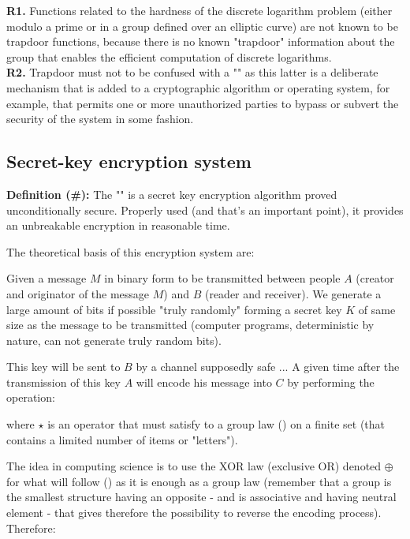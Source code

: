 	\begin{tcolorbox}[title=Remarks,colframe=black,arc=10pt]
	\textbf{R1.} Functions related to the hardness of the discrete logarithm problem (either modulo a prime or in a group defined over an elliptic curve) are not known to be trapdoor functions, because there is no known "trapdoor" information about the group that enables the efficient computation of discrete logarithms.\\
	
	\textbf{R2.} Trapdoor must not to be confused with a "" as this latter is a deliberate mechanism that is added to a cryptographic algorithm or operating system, for example, that permits one or more unauthorized parties to bypass or subvert the security of the system in some fashion.
	\end{tcolorbox}
	
	\subsection{Secret-key encryption system}
	\textbf{Definition (\#\mydef):} The "" is a secret key encryption algorithm proved unconditionally secure. Properly used (and that's an important point), it provides an unbreakable encryption in reasonable time.
	
	The theoretical basis of this encryption system are:
	
	Given a message $M$ in binary form to be transmitted between people $A$ (creator and originator of the message $M$) and $B$ (reader and receiver). We generate a large amount of bits if possible "truly randomly" forming a secret key $K$ of same size as the message to be transmitted (computer programs, deterministic by nature, can not generate truly random bits).
	
	This key will be sent to $B$ by a channel supposedly safe ... A given time after the transmission of this key $A$ will encode his message into $C$ by performing the operation:
	
	where $\star$ is an operator that must satisfy to a group law () on a finite set (that contains a limited number of items or "letters").
	
	The idea in computing science is to use the XOR law (exclusive OR) denoted $\oplus$ for what will follow () as it is enough as a group law (remember that a group is the smallest structure having an opposite - and is associative and having neutral element - that gives therefore the possibility to reverse the encoding process). Therefore:
	
